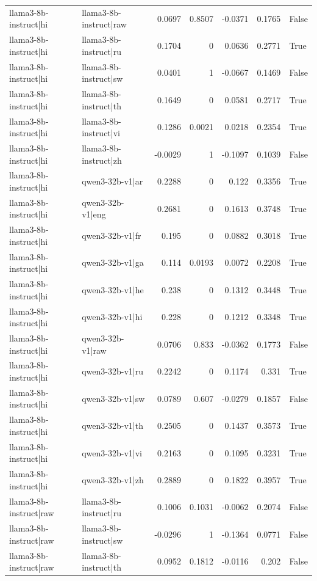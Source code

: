 \begin{table}
\begin{tabular}{l l r r r r l}
llama3-8b-instruct|hi & llama3-8b-instruct|raw & 0.0697 & 0.8507 & -0.0371 & 0.1765 & False \\
llama3-8b-instruct|hi & llama3-8b-instruct|ru & 0.1704 & 0 & 0.0636 & 0.2771 & True \\
llama3-8b-instruct|hi & llama3-8b-instruct|sw & 0.0401 & 1 & -0.0667 & 0.1469 & False \\
llama3-8b-instruct|hi & llama3-8b-instruct|th & 0.1649 & 0 & 0.0581 & 0.2717 & True \\
llama3-8b-instruct|hi & llama3-8b-instruct|vi & 0.1286 & 0.0021 & 0.0218 & 0.2354 & True \\
llama3-8b-instruct|hi & llama3-8b-instruct|zh & -0.0029 & 1 & -0.1097 & 0.1039 & False \\
llama3-8b-instruct|hi & qwen3-32b-v1|ar & 0.2288 & 0 & 0.122 & 0.3356 & True \\
llama3-8b-instruct|hi & qwen3-32b-v1|eng & 0.2681 & 0 & 0.1613 & 0.3748 & True \\
llama3-8b-instruct|hi & qwen3-32b-v1|fr & 0.195 & 0 & 0.0882 & 0.3018 & True \\
llama3-8b-instruct|hi & qwen3-32b-v1|ga & 0.114 & 0.0193 & 0.0072 & 0.2208 & True \\
llama3-8b-instruct|hi & qwen3-32b-v1|he & 0.238 & 0 & 0.1312 & 0.3448 & True \\
llama3-8b-instruct|hi & qwen3-32b-v1|hi & 0.228 & 0 & 0.1212 & 0.3348 & True \\
llama3-8b-instruct|hi & qwen3-32b-v1|raw & 0.0706 & 0.833 & -0.0362 & 0.1773 & False \\
llama3-8b-instruct|hi & qwen3-32b-v1|ru & 0.2242 & 0 & 0.1174 & 0.331 & True \\
llama3-8b-instruct|hi & qwen3-32b-v1|sw & 0.0789 & 0.607 & -0.0279 & 0.1857 & False \\
llama3-8b-instruct|hi & qwen3-32b-v1|th & 0.2505 & 0 & 0.1437 & 0.3573 & True \\
llama3-8b-instruct|hi & qwen3-32b-v1|vi & 0.2163 & 0 & 0.1095 & 0.3231 & True \\
llama3-8b-instruct|hi & qwen3-32b-v1|zh & 0.2889 & 0 & 0.1822 & 0.3957 & True \\
llama3-8b-instruct|raw & llama3-8b-instruct|ru & 0.1006 & 0.1031 & -0.0062 & 0.2074 & False \\
llama3-8b-instruct|raw & llama3-8b-instruct|sw & -0.0296 & 1 & -0.1364 & 0.0771 & False \\
llama3-8b-instruct|raw & llama3-8b-instruct|th & 0.0952 & 0.1812 & -0.0116 & 0.202 & False \\

\end{tabular}
\end{table}
